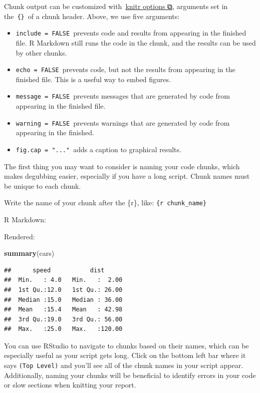 \documentclass[
]{book}
\newenvironment{Shaded}{\begin{snugshade}}{\end{snugshade}}
\newcommand{\KeywordTok}[1]{\textcolor[rgb]{0.13,0.29,0.53}{\textbf{#1}}}
\newcommand{\NormalTok}[1]{#1}
\providecommand{\tightlist}{%
  \setlength{\itemsep}{0pt}\setlength{\parskip}{0pt}}
\begin{document}
Chunk output can be customized with~\href{http://yihui.name/knitr/options/}{knitr options ⧉}, arguments set in the~\texttt{\{\}}~of a chunk header. Above, we use five arguments:

\begin{itemize}
\tightlist
\item
  \texttt{include\ =\ FALSE}~prevents code and results from appearing in the finished file. R Markdown still runs the code in the chunk, and the results can be used by other chunks.
\item
  \texttt{echo\ =\ FALSE}~prevents code, but not the results from appearing in the finished file. This is a useful way to embed figures.
\item
  \texttt{message\ =\ FALSE}~prevents messages that are generated by code from appearing in the finished file.
\item
  \texttt{warning\ =\ FALSE}~prevents warnings that are generated by code from appearing in the finished.
\item
  \texttt{fig.cap\ =\ "..."}~adds a caption to graphical results.
\end{itemize}

The first thing you may want to consider is naming your code chunks, which makes degubbing easier, especially if you have a long script. Chunk names must be unique to each chunk.

Write the name of your chunk after the \{r\}, like: \texttt{\{r\ chunk\_name\}}

R Markdown:

Rendered:

\begin{Shaded}
\begin{Highlighting}[]
\KeywordTok{summary}\NormalTok{(cars)}
\end{Highlighting}
\end{Shaded}

\begin{verbatim}
##      speed           dist       
##  Min.   : 4.0   Min.   :  2.00  
##  1st Qu.:12.0   1st Qu.: 26.00  
##  Median :15.0   Median : 36.00  
##  Mean   :15.4   Mean   : 42.98  
##  3rd Qu.:19.0   3rd Qu.: 56.00  
##  Max.   :25.0   Max.   :120.00
\end{verbatim}

You can use RStudio to navigate to chunks based on their names, which can be especially useful as your script gets long. Click on the bottom left bar where it says \texttt{(Top\ Level)} and you'll see all of the chunk names in your script appear. Additionally, naming your chunks will be beneficial to identify errors in your code or slow sections when knitting your report.
\end{document}

